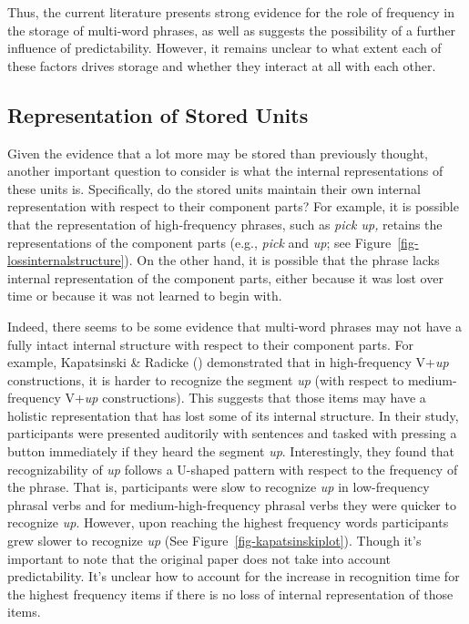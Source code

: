 \documentclass[
  12pt,
  letterpaper,
]{scrreport}
\begin{document}
Thus, the current literature presents strong evidence for the role of
frequency in the storage of multi-word phrases, as well as suggests the
possibility of a further influence of predictability. However, it
remains unclear to what extent each of these factors drives storage and
whether they interact at all with each other.

\subsection{Representation of Stored
Units}\label{representation-of-stored-units}

Given the evidence that a lot more may be stored than previously
thought, another important question to consider is what the internal
representations of these units is. Specifically, do the stored units
maintain their own internal representation with respect to their
component parts? For example, it is possible that the representation of
high-frequency phrases, such as \emph{pick up,} retains the
representations of the component parts (e.g., \emph{pick} and \emph{up};
see Figure~\ref{fig-lossinternalstructure}). On the other hand, it is
possible that the phrase lacks internal representation of the component
parts, either because it was lost over time or because it was not
learned to begin with.

Indeed, there seems to be some evidence that multi-word phrases may not
have a fully intact internal structure with respect to their component
parts. For example, Kapatsinski \& Radicke
()
demonstrated that in high-frequency V+\emph{up} constructions, it is
harder to recognize the segment \emph{up} (with respect to
medium-frequency V+\emph{up} constructions). This suggests that those
items may have a holistic representation that has lost some of its
internal structure. In their study, participants were presented
auditorily with sentences and tasked with pressing a button immediately
if they heard the segment \emph{up}. Interestingly, they found that
recognizability of \emph{up} follows a U-shaped pattern with respect to
the frequency of the phrase. That is, participants were slow to
recognize \emph{up} in low-frequency phrasal verbs and for
medium-high-frequency phrasal verbs they were quicker to recognize
\emph{up}. However, upon reaching the highest frequency words
participants grew slower to recognize \emph{up} (See
Figure~\ref{fig-kapatsinskiplot}). Though it's important to note that
the original paper does not take into account predictability. It's
unclear how to account for the increase in recognition time for the
highest frequency items if there is no loss of internal representation
of those items.
\end{document}
